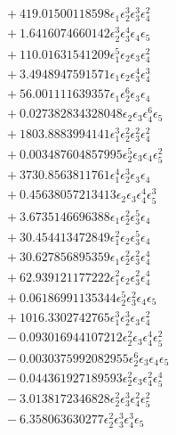 \documentclass[10pt]{article}
\begin{document}
\begin{align*}
&{}  + 419.01500118598 \epsilon_{1} \epsilon_{2}^{3} \epsilon_{3}^{3} \epsilon_{4}^{2} \\
&{}  + 1.6416074660142 \epsilon_{2}^{3} \epsilon_{3}^{4} \epsilon_{4} \epsilon_{5} \\
&{}  + 110.01631541209 \epsilon_{1}^{5} \epsilon_{2} \epsilon_{3} \epsilon_{4}^{2} \\
&{}  + 3.4948947591571 \epsilon_{1} \epsilon_{2} \epsilon_{3}^{4} \epsilon_{4}^{3} \\
&{}  + 56.001111639357 \epsilon_{1} \epsilon_{2}^{6} \epsilon_{3} \epsilon_{4} \\
&{}  + 0.027382834328048 \epsilon_{2} \epsilon_{3} \epsilon_{4}^{6} \epsilon_{5} \\
&{}  + 1803.8883994141 \epsilon_{1}^{3} \epsilon_{2}^{2} \epsilon_{3}^{2} \epsilon_{4}^{2} \\
&{}  + 0.003487604857995 \epsilon_{2}^{5} \epsilon_{3} \epsilon_{4} \epsilon_{5}^{2} \\
&{}  + 3730.8563811761 \epsilon_{1}^{4} \epsilon_{2}^{3} \epsilon_{3} \epsilon_{4} \\
&{}  + 0.45638057213413 \epsilon_{2} \epsilon_{3} \epsilon_{4}^{4} \epsilon_{5}^{3} \\
&{}  + 3.6735146696388 \epsilon_{1} \epsilon_{2}^{2} \epsilon_{3}^{5} \epsilon_{4} \\
&{}  + 30.454413472849 \epsilon_{1}^{2} \epsilon_{2} \epsilon_{3}^{5} \epsilon_{4} \\
&{}  + 30.627856895359 \epsilon_{1} \epsilon_{2}^{2} \epsilon_{3}^{2} \epsilon_{4}^{4} \\
&{}  + 62.939121177222 \epsilon_{1}^{2} \epsilon_{2} \epsilon_{3}^{2} \epsilon_{4}^{4} \\
&{}  + 0.06186991135344 \epsilon_{2}^{5} \epsilon_{3}^{2} \epsilon_{4} \epsilon_{5} \\
&{}  + 1016.3302742765 \epsilon_{1}^{3} \epsilon_{2}^{3} \epsilon_{3} \epsilon_{4}^{2} \\
&{}  - 0.093016944107212 \epsilon_{2}^{2} \epsilon_{3} \epsilon_{4}^{4} \epsilon_{5}^{2} \\
&{}  - 0.0030375992082955 \epsilon_{2}^{6} \epsilon_{3} \epsilon_{4} \epsilon_{5} \\
&{}  - 0.044361927189593 \epsilon_{2}^{2} \epsilon_{3} \epsilon_{4}^{2} \epsilon_{5}^{4} \\
&{}  - 3.0138172346828 \epsilon_{2}^{2} \epsilon_{3}^{3} \epsilon_{4}^{2} \epsilon_{5}^{2} \\
&{}  - 6.358063630277 \epsilon_{2}^{2} \epsilon_{3}^{3} \epsilon_{4}^{3} \epsilon_{5} \\

\end{align*}
\end{document}
